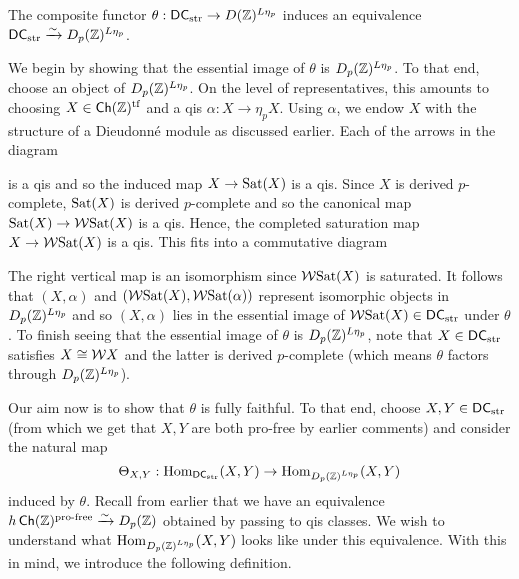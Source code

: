 \documentclass[11pt]{article}
\newcommand{\DC}{\mathsf{DC}} %
\newcommand{\pf}{\textup{pro-free}} %
\newcommand{\Sat}{\textup{Sat}} %
\newcommand{\str}{\textup{str}} %
\newcommand{\W}{\mathcal{W}}
\begin{document}
\begin{theorem}
The composite functor $\theta: \DC_{\str}\to D(\Z)^{L\eta_p}$ induces an equivalence $\DC_{\str}\xto{\sim}D_p(\Z)^{L\eta_p}$.
\end{theorem}

We begin by showing that the essential image of $\theta$ is $D_p(\mathbb{Z})^{L\eta_p}$. To that end, choose an object of $D_p(\mathbb{Z})^{L\eta_p}$. On the level of representatives, this amounts to choosing $X\in\operatorname{\mathsf{Ch}}(\mathbb{Z})^{\operatorname{tf}}$ and a qis $\alpha: X\to\eta_pX$. Using $\alpha$, we endow $X$ with the structure of a Dieudonn\'{e} module as discussed earlier. Each of the arrows in the diagram 
\begin{center}
\end{center}
is a qis and so the induced map $X\to\Sat(X)$ is a qis. Since $X$ is derived $p$-complete, $\Sat(X)$ is derived $p$-complete and so the canonical map $\Sat(X)\to\W\Sat(X)$ is a qis. Hence, the completed saturation map $X\to\W\Sat(X)$ is a qis. This fits into a commutative diagram
\begin{center}
\end{center}
The right vertical map is an isomorphism since $\W\Sat(X)$ is saturated. It follows that $(X,\alpha)$ and $(\W\Sat(X),\W\Sat(\alpha))$ represent isomorphic objects in $D_p(\mathbb{Z})^{L\eta_p}$ and so $(X,\alpha)$ lies in the essential image of $\W\Sat(X)\in\DC_{\str}$ under $\theta$. To finish seeing that the essential image of $\theta$ is $D_p(\mathbb{Z})^{L\eta_p}$, note that $X\in\DC_{\str}$ satisfies $X\iso\W X$ and the latter is derived $p$-complete (which means $\theta$ factors through $D_p(\mathbb{Z})^{L\eta_p}$). 

Our aim now is to show that $\theta$ is fully faithful. To that end, choose $X,Y\in\DC_{\str}$ (from which we get that $X,Y$ are both pro-free by earlier comments) and consider the natural map
$$\Theta_{X,Y}: \Hom_{\DC_{\str}}(X,Y)\to\Hom_{D_p(\Z)^{L\eta_p}}(X,Y)$$
induced by $\theta$. Recall from earlier that we have an equivalence $h\Ch(\Z)^{\pf}\xto{\sim}D_p(\Z)$ obtained by passing to qis classes. We wish to understand what $\operatorname{Hom}_{D_p(\mathbb{Z})^{L\eta_p}}(X,Y)$ looks like under this equivalence. With this in mind, we introduce the following definition.
\end{document}
